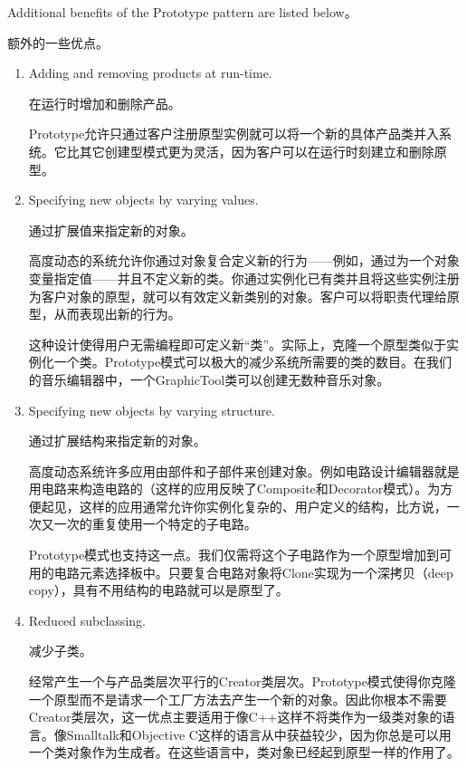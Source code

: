 Additional benefits of the Prototype pattern are listed below。

额外的一些优点。

\begin{enumerate}

\item Adding and removing products at run-time.

	  在运行时增加和删除产品。
	  
	  Prototype允许只通过客户注册原型实例就可以将一个新的具体产品类并入系统。它比其它创建型模式更为灵活，因为客户可以在运行时刻建立和删除原型。

\item Specifying new objects by varying values.

      通过扩展值来指定新的对象。

	  高度动态的系统允许你通过对象复合定义新的行为——例如，通过为一个对象变量指定值——并且不定义新的类。你通过实例化已有类并且将这些实例注册为客户对象的原型，就可以有效定义新类别的对象。客户可以将职责代理给原型，从而表现出新的行为。

	  这种设计使得用户无需编程即可定义新“类”。实际上，克隆一个原型类似于实例化一个类。Prototype模式可以极大的减少系统所需要的类的数目。在我们的音乐编辑器中，一个GraphicTool类可以创建无数种音乐对象。

\item Specifying new objects by varying structure.

	  通过扩展结构来指定新的对象。

	  高度动态系统许多应用由部件和子部件来创建对象。例如电路设计编辑器就是用电路来构造电路的（这样的应用反映了Composite和Decorator模式）。为方便起见，这样的应用通常允许你实例化复杂的、用户定义的结构，比方说，一次又一次的重复使用一个特定的子电路。

	  Prototype模式也支持这一点。我们仅需将这个子电路作为一个原型增加到可用的电路元素选择板中。只要复合电路对象将Clone实现为一个深拷贝（deep copy），具有不用结构的电路就可以是原型了。

\item Reduced subclassing. 

      减少子类。

	  经常产生一个与产品类层次平行的Creator类层次。Prototype模式使得你克隆一个原型而不是请求一个工厂方法去产生一个新的对象。因此你根本不需要Creator类层次，这一优点主要适用于像C++这样不将类作为一级类对象的语言。像Smalltalk和Objective C这样的语言从中获益较少，因为你总是可以用一个类对象作为生成者。在这些语言中，类对象已经起到原型一样的作用了。


\end{enumerate}
